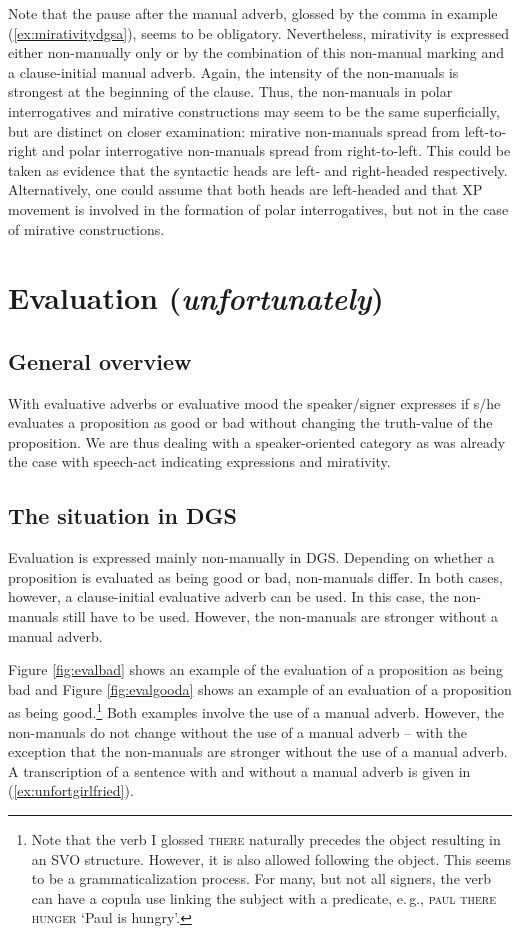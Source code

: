 \noindent Note that the pause after the manual adverb, glossed by the comma in example (\ref{ex:mirativitydgsa}), seems to be obligatory. Nevertheless, mirativity is expressed either non-manually only or by the combination of this non-manual marking and a clause-initial manual adverb. Again, the intensity of the non-manuals is strongest at the beginning of the clause. Thus, the non-manuals in polar interrogatives and mirative constructions may seem to be the same superficially, but are distinct on closer examination: mirative non-manuals spread from left-to-right and polar interrogative non-manuals spread from right-to-left. This could be taken as evidence that the syntactic heads are left- and right-headed respectively. Alternatively, one could assume that both heads are left-headed and that XP movement is involved in the formation of polar interrogatives, but not in the case of mirative constructions.

\section{Evaluation (\textit{unfortunately})}\label{evalllll}

\subsection{General overview}

With evaluative adverbs or evaluative mood the speaker/signer expresses if s/he evaluates a proposition as good or bad without changing the truth-value of the proposition. We are thus dealing with a speaker-oriented category as was already the case with speech-act indicating expressions and mirativity. 

\subsection{The situation in DGS}
Evaluation is expressed mainly non-manually in DGS. Depending on whether a proposition is evaluated as being good or bad, non-manuals differ. In both cases, however, a clause-initial evaluative adverb can be used. In this case, the non-manuals still have to be used. However, the non-manuals are stronger without a manual adverb. 

Figure \ref{fig:evalbad} shows an example of the evaluation of a proposition as being bad and Figure \ref{fig:evalgooda} shows an example of an evaluation of a proposition as being good.\footnote{ Note that the verb I glossed \textsc{there} naturally precedes the object resulting in an SVO structure. However, it is also allowed following the object. This seems to be a grammaticalization process. For many, but not all signers, the verb can have a copula use linking the subject with a predicate, e.\,g.,  \textsc{paul there hunger} `Paul is hungry'.\label{footnotecopula}} Both examples involve the use of a manual adverb. However, the non-manuals do not change without the use of a manual adverb -- with the exception that the non-manuals are stronger without the use of a manual adverb. A transcription of a sentence with and without a manual adverb is given in (\ref{ex:unfortgirlfried}).

